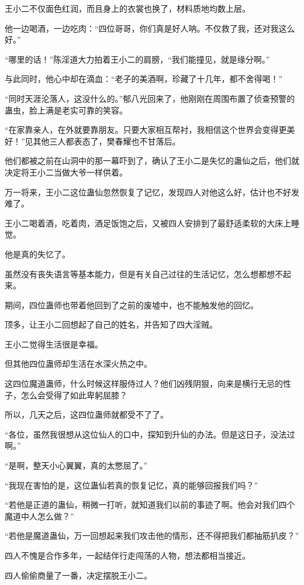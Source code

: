 \begin{this_body}
王小二不仅面色红润，而且身上的衣裳也换了，材料质地均数上层。

他一边喝酒，一边吃肉：“四位哥哥，你们真是好人呐。不仅救了我，还对我这么好。”

“哪里的话！”陈淫道大力拍着王小二的肩膀，“我们能撞见，就是缘分啊。”

与此同时，他心中却在滴血：“老子的美酒啊，珍藏了十几年，都不舍得喝！”

“同时天涯沦落人，这没什么的。”郁八光回来了，他刚刚在周围布置了侦查预警的蛊虫，脸上满是老实可靠的笑容。

“在家靠亲人，在外就要靠朋友。只要大家相互帮衬，我相信这个世界会变得更美好！”见其他三人都表态了，樊春耀也不甘落后。

他们都被之前在山洞中的那一幕吓到了，确认了王小二是失忆的蛊仙之后，他们就决定将王小二当做大爷一样供着。

万一将来，王小二这位蛊仙忽然恢复了记忆，发现四人对他这么好，估计也不好发难了。

王小二喝着酒，吃着肉，酒足饭饱之后，又被四人安排到了最舒适柔软的大床上睡觉。

他是真的失忆了。

虽然没有丧失语言等基本能力，但是有关自己过往的生活记忆，怎么想都想不起来。

期间，四位蛊师也带着他回到了之前的废墟中，也不能触发他的回忆。

顶多，让王小二回想起了自己的姓名，并告知了四大淫贼。

王小二觉得生活很是幸福。

但其他四位蛊师却生活在水深火热之中。

这四位魔道蛊师，什么时候这样服侍过人？他们凶残阴狠，向来是横行无忌的性子，怎么会受得了如此卑躬屈膝？

所以，几天之后，这四位蛊师就都受不了了。

“各位，虽然我很想从这位仙人的口中，探知到升仙的办法。但是这日子，没法过啊。”

“是啊，整天小心翼翼，真的太憋屈了。”

“我现在害怕的是，这位蛊仙若真的恢复记忆，真的能够回报我们吗？”

“若他是正道的蛊仙，稍微一打听，就知道我们以前的事迹了啊。他会对我们四个魔道中人怎么做？”

“若他是魔道蛊仙，万一回想起来我们攻击他的情形，还不得把我们都抽筋扒皮？”

四人不愧是合作多年，一起结伴行走闯荡的人物，想法都相当接近。

四人偷偷商量了一番，决定摆脱王小二。


\end{this_body}
